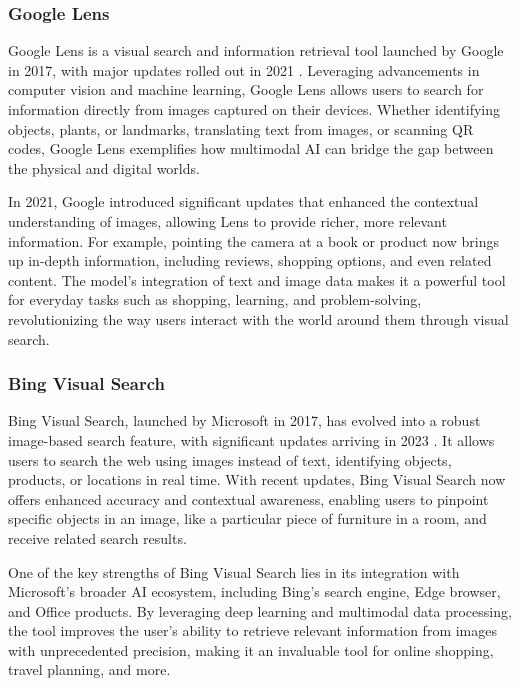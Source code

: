\subsubsection{Google Lens}

Google Lens is a visual search and information retrieval tool launched by Google in 2017, with major updates rolled out in 2021 \cite{GoogleLens}. 
Leveraging advancements in computer vision and machine learning, Google Lens allows users to search for information directly from images captured on their devices. 
Whether identifying objects, plants, or landmarks, translating text from images, or scanning QR codes, Google Lens exemplifies how multimodal AI can bridge the gap between the physical and digital worlds.

In 2021, Google introduced significant updates that enhanced the contextual understanding of images, allowing Lens to provide richer, more relevant information. 
For example, pointing the camera at a book or product now brings up in-depth information, including reviews, shopping options, and even related content. 
The model's integration of text and image data makes it a powerful tool for everyday tasks such as shopping, learning, and problem-solving, revolutionizing the way users interact with the world around them through visual search.

\subsubsection{Bing Visual Search}

Bing Visual Search, launched by Microsoft in 2017, has evolved into a robust image-based search feature, with significant updates arriving in 2023 \cite{BingVisualSearch}. 
It allows users to search the web using images instead of text, identifying objects, products, or locations in real time. 
With recent updates, Bing Visual Search now offers enhanced accuracy and contextual awareness, enabling users to pinpoint specific objects in an image, like a particular piece of furniture in a room, and receive related search results.

One of the key strengths of Bing Visual Search lies in its integration with Microsoft's broader AI ecosystem, including Bing's search engine, Edge browser, and Office products. 
By leveraging deep learning and multimodal data processing, the tool improves the user's ability to retrieve relevant information from images with unprecedented precision, making it an invaluable tool for online shopping, travel planning, and more.

